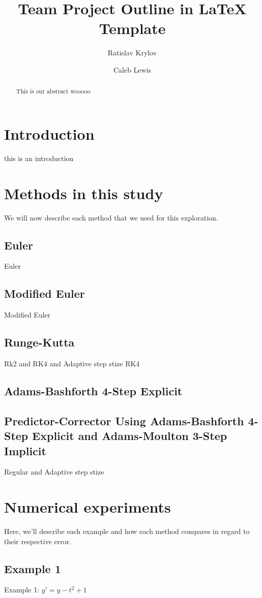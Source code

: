 \documentclass[11pt]{article}
\title{Team Project Outline in LaTeX Template}
\author{Ratislav Krylov \and Caleb Lewis}
\begin{document}
\maketitle

\begin{abstract}
This is our abstract wooooo
\end{abstract}

\section{Introduction}
this is an introduction

\section{Methods in this study}
We will now describe each method that we used for this exploration.

\subsection{Euler}
Euler

\subsection{Modified Euler}
Modified Euler

\subsection{Runge-Kutta}
Rk2 and RK4 and Adaptive step stize RK4

\subsection{Adams-Bashforth 4-Step Explicit}


\subsection{Predictor-Corrector Using Adams-Bashforth 4-Step Explicit and Adams-Moulton 3-Step Implicit}
Regular and Adaptive step stize

\section{Numerical experiments}
Here, we'll describe each example and how each method compares in regard to their respective error.

\subsection{Example 1}
Example 1: $y' = y - t^2 + 1$
\end{document}
